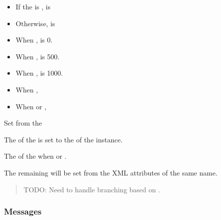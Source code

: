 \begin{description}[font=\it\bfseries,labelindent=4em,labelwidth=6em,leftmargin=!]    
  \item[EnableState]
  \begin{itemize}
    \item If the  is ,  is 
    \item Otherwise,  is 
  \end{itemize}
  \vspace{1em}
  \item[Severity]
  \begin{itemize}
    \item When ,  is 0.
    \item When ,  is 500.
    \item When ,  is 1000.
  \end{itemize}
  \vspace{1em}
  \item[Retain]
  \begin{itemize}
    \item When , 
    \item When  or , 
  \end{itemize}
  \vspace{1em}
  \item[Message] Set from the 
  \item[Time] 
  \item[NodeId] The  of the  is set to the  of the   instance.
  \item[Message] The  of the  when  or .
  \item[\ldots] The remaining  will be set from the XML attributes of the same name.
\end{description}

\begin{quote}
  \color{red} TODO: Need to handle branching based on .
\end{quote}

\subsubsection{Messages}

